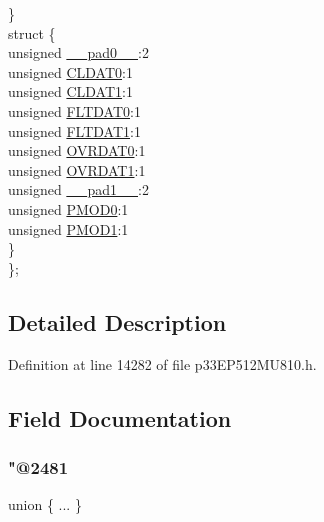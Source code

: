 \begin{DoxyCompactItemize}
\begin{tabbing}
\>\} \\
\>struct \{\\
\>\>unsigned \hyperlink{structtag_i_o_c_o_n2_b_i_t_s_adf71f3d8410c1f1dbbc96680a92c49af}{\_\_pad0\_\_}:2\\
\>\>unsigned \hyperlink{structtag_i_o_c_o_n2_b_i_t_s_a524fe5d7c4f19a9e5bab6fdae8cb6113}{CLDAT0}:1\\
\>\>unsigned \hyperlink{structtag_i_o_c_o_n2_b_i_t_s_abd730465de1cbb6fd169fef4c9f97b9e}{CLDAT1}:1\\
\>\>unsigned \hyperlink{structtag_i_o_c_o_n2_b_i_t_s_a154c32b551ecc420f476def330e87abd}{FLTDAT0}:1\\
\>\>unsigned \hyperlink{structtag_i_o_c_o_n2_b_i_t_s_a76d169f1247080fb508c7b31f62e89ab}{FLTDAT1}:1\\
\>\>unsigned \hyperlink{structtag_i_o_c_o_n2_b_i_t_s_a45d53d0768dd2659f98447ad77cc91b1}{OVRDAT0}:1\\
\>\>unsigned \hyperlink{structtag_i_o_c_o_n2_b_i_t_s_a095c02d71ec41de4ed9985a86207253f}{OVRDAT1}:1\\
\>\>unsigned \hyperlink{structtag_i_o_c_o_n2_b_i_t_s_acaf2d0924a107ec6e8d2e31febaf66f9}{\_\_pad1\_\_}:2\\
\>\>unsigned \hyperlink{structtag_i_o_c_o_n2_b_i_t_s_ac125b1e88bd44f7f044dcb0185cfb781}{PMOD0}:1\\
\>\>unsigned \hyperlink{structtag_i_o_c_o_n2_b_i_t_s_a961c1af920bb390a3b4ff925e45fa059}{PMOD1}:1\\
\>\} \\
\}; \\

\end{tabbing}\end{DoxyCompactItemize}


\subsection{Detailed Description}


Definition at line 14282 of file p33\+E\+P512\+M\+U810.\+h.



\subsection{Field Documentation}
\mbox{\label{structtag_i_o_c_o_n2_b_i_t_s_a4b7c21ed270b1d2ce4237b32169baab2}} 
\subsubsection{\texorpdfstring{"@2481}{@2481}}
{\footnotesize\ttfamily union \{ ... \} }


